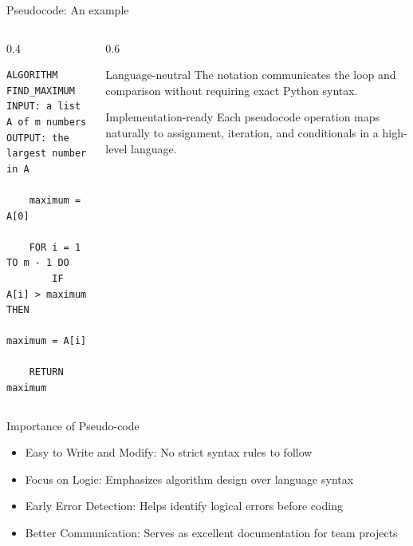 \documentclass[aspectratio=169]{beamer}
\begin{document}
\begin{frame}[fragile]{Pseudocode: An example}
  \begin{columns}[T]
    \begin{column}{0.4\textwidth}
\begin{lstlisting}[style=pseudo]
ALGORITHM FIND_MAXIMUM
INPUT: a list A of m numbers
OUTPUT: the largest number in A

    maximum = A[0]

    FOR i = 1 TO m - 1 DO
        IF A[i] > maximum THEN
            maximum = A[i]

    RETURN maximum
\end{lstlisting}
    \end{column}
    \begin{column}{0.6\textwidth}
      \begin{block}{Language-neutral}
        The notation communicates the loop and comparison without requiring
        exact Python syntax.
      \end{block}
      \begin{exampleblock}{Implementation-ready}
        Each pseudocode operation maps naturally to assignment, iteration, and
        conditionals in a high-level language.
      \end{exampleblock}
    \end{column}
  \end{columns}
\end{frame}






\begin{frame}{Importance of Pseudo-code}

\begin{itemize}
    \item Easy to Write and Modify: No strict syntax rules to follow
   \item Focus on Logic: Emphasizes algorithm design over language syntax
   \item Early Error Detection: Helps identify logical errors before coding
   \item Better Communication: Serves as excellent documentation for team projects
\end{itemize}
\end{frame}
\end{document}

